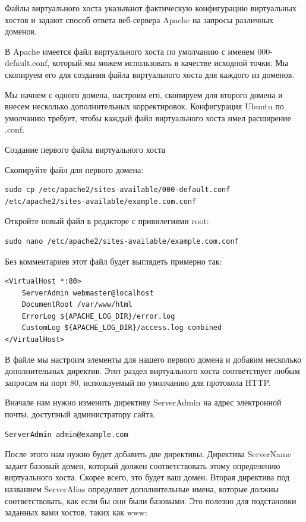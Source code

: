 \documentclass[14pt, a4paper]{article}
\begin{document}
Файлы виртуального хоста указывают фактическую конфигурацию виртуальных хостов и задают способ 
ответа веб-сервера Apache на запросы различных доменов.

В Apache имеется файл виртуального хоста по умолчанию с именем 000-default.conf, который мы можем использовать 
в качестве исходной точки. Мы скопируем его для создания файла виртуального хоста для каждого из доменов.

Мы начнем с одного домена, настроим его, скопируем для второго домена и внесем несколько дополнительных 
корректировок. Конфигурация Ubuntu по умолчанию требует, чтобы каждый файл виртуального хоста имел расширение .conf.

Создание первого файла виртуального хоста

Скопируйте файл для первого домена:

\begin{lstlisting}
sudo cp /etc/apache2/sites-available/000-default.conf /etc/apache2/sites-available/example.com.conf
\end{lstlisting}

Откройте новый файл в редакторе с привилегиями root:

\begin{lstlisting}
sudo nano /etc/apache2/sites-available/example.com.conf
\end{lstlisting}

Без комментариев этот файл будет выглядеть примерно так:
\begin{lstlisting}
<VirtualHost *:80>
    ServerAdmin webmaster@localhost
    DocumentRoot /var/www/html
    ErrorLog ${APACHE_LOG_DIR}/error.log
    CustomLog ${APACHE_LOG_DIR}/access.log combined
</VirtualHost>
\end{lstlisting}

В файле мы настроим элементы для нашего первого домена и добавим несколько дополнительных директив. 
Этот раздел виртуального хоста соответствует любым запросам на порт 80, используемый по умолчанию для протокола HTTP.

Вначале нам нужно изменить директиву ServerAdmin на адрес электронной почты, доступный администратору сайта.

\begin{lstlisting}
ServerAdmin admin@example.com
\end{lstlisting}

После этого нам нужно будет добавить две директивы. Директива ServerName задает базовый домен, 
который должен соответствовать этому определению виртуального хоста. Скорее всего, это будет ваш 
домен. Вторая директива под названием ServerAlias определяет дополнительные имена, которые должны 
соответствовать, как если бы они были базовыми. Это полезно для подстановки заданных вами хостов, таких как www:
\end{document}
